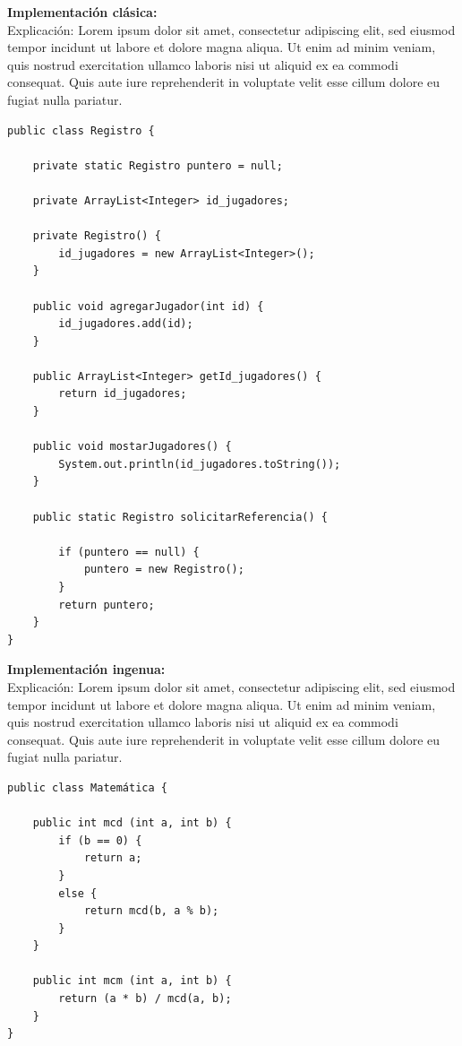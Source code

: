 \documentclass[12pt]{book}
\begin{document}
\textbf{Implementación clásica:} \\

Explicación: Lorem ipsum dolor sit amet, consectetur adipiscing elit, sed eiusmod tempor incidunt ut labore et dolore magna aliqua. Ut enim ad minim veniam, quis nostrud exercitation ullamco laboris nisi ut aliquid ex ea commodi consequat. Quis aute iure reprehenderit in voluptate velit esse cillum dolore eu fugiat nulla pariatur.

\begin{verbatim}
public class Registro {
	
    private static Registro puntero = null;
    
    private ArrayList<Integer> id_jugadores;
    
    private Registro() {
        id_jugadores = new ArrayList<Integer>();
    }
    
    public void agregarJugador(int id) {
        id_jugadores.add(id);
    }
    
    public ArrayList<Integer> getId_jugadores() {
        return id_jugadores;
    }
    
    public void mostarJugadores() {
        System.out.println(id_jugadores.toString());
    }
    
    public static Registro solicitarReferencia() {

        if (puntero == null) {
            puntero = new Registro();
        }   
        return puntero;
    }
}
\end{verbatim}

\textbf{Implementación ingenua:} \\
Explicación: Lorem ipsum dolor sit amet, consectetur adipiscing elit, sed eiusmod tempor incidunt ut labore et dolore magna aliqua. Ut enim ad minim veniam, quis nostrud exercitation ullamco laboris nisi ut aliquid ex ea commodi consequat. Quis aute iure reprehenderit in voluptate velit esse cillum dolore eu fugiat nulla pariatur.

\begin{verbatim}
public class Matemática {
	
    public int mcd (int a, int b) {
        if (b == 0) {
            return a;
        }
        else {
            return mcd(b, a % b);
        }
    }
    
    public int mcm (int a, int b) {
        return (a * b) / mcd(a, b);
    }
}
\end{verbatim}
\end{document}
